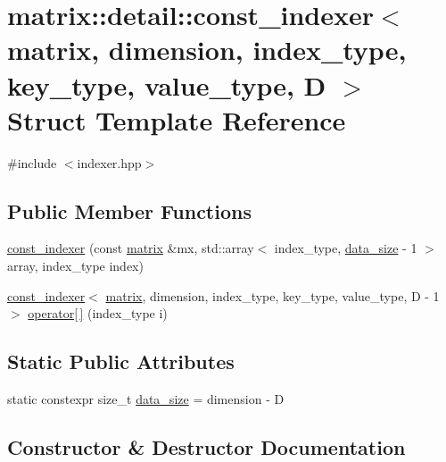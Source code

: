 \hypertarget{structmatrix_1_1detail_1_1const__indexer}{}\section{matrix\+:\+:detail\+:\+:const\+\_\+indexer$<$ matrix, dimension, index\+\_\+type, key\+\_\+type, value\+\_\+type, D $>$ Struct Template Reference}
\label{structmatrix_1_1detail_1_1const__indexer}


{\ttfamily \#include $<$indexer.\+hpp$>$}

\subsection*{Public Member Functions}
\begin{DoxyCompactItemize}
\item 
\hyperlink{structmatrix_1_1detail_1_1const__indexer_a053f715a31fedbd58ada0cb3cf015c04}{const\+\_\+indexer} (const \hyperlink{structmatrix_1_1matrix}{matrix} \&mx, std\+::array$<$ index\+\_\+type, \hyperlink{structmatrix_1_1detail_1_1const__indexer_aaed44635b3a2322c6fc204cbd68281fb}{data\+\_\+size} -\/ 1 $>$ array, index\+\_\+type index)
\item 
\hyperlink{structmatrix_1_1detail_1_1const__indexer}{const\+\_\+indexer}$<$ \hyperlink{structmatrix_1_1matrix}{matrix}, dimension, index\+\_\+type, key\+\_\+type, value\+\_\+type, D -\/ 1 $>$ \hyperlink{structmatrix_1_1detail_1_1const__indexer_aa277df84f820cefa86031447cd4c7132}{operator\mbox{[}$\,$\mbox{]}} (index\+\_\+type i)
\end{DoxyCompactItemize}
\subsection*{Static Public Attributes}
\begin{DoxyCompactItemize}
\item 
static constexpr size\+\_\+t \hyperlink{structmatrix_1_1detail_1_1const__indexer_aaed44635b3a2322c6fc204cbd68281fb}{data\+\_\+size} = dimension -\/ D
\end{DoxyCompactItemize}


\subsection{Constructor \& Destructor Documentation}
\mbox{\label{structmatrix_1_1detail_1_1const__indexer_a053f715a31fedbd58ada0cb3cf015c04}} 
